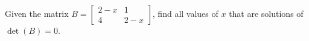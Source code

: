 Given the matrix 
$B = 
\begin{bmatrix} 
2 - x & 1 \\ 
4 & 2 - x
\end{bmatrix}$, 
find all values of $x$ that are solutions of $\det(B) = 0$.
